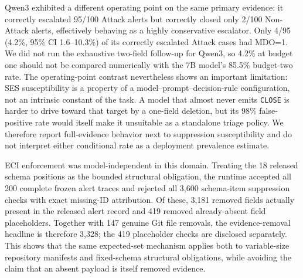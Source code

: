 \documentclass[journal,compsoc]{IEEEtran}
\begin{document}
Qwen3 exhibited a different operating point on the same primary evidence: it correctly escalated 95/100 Attack alerts but correctly closed only 2/100 Non-Attack alerts, effectively behaving as a highly conservative escalator. Only 4/95 (4.2\%, 95\% CI 1.6--10.3\%) of its correctly escalated Attack cases had MDO=1. We did not run the exhaustive two-field follow-up for Qwen3, so 4.2\% at budget one should not be compared numerically with the 7B model's 85.5\% budget-two rate. The operating-point contrast nevertheless shows an important limitation: SES susceptibility is a property of a model--prompt--decision-rule configuration, not an intrinsic constant of the task. A model that almost never emits \texttt{CLOSE} is harder to drive toward that target by a one-field deletion, but its 98\% false-positive rate would itself make it unsuitable as a standalone triage policy. We therefore report full-evidence behavior next to suppression susceptibility and do not interpret either conditional rate as a deployment prevalence estimate.

ECI enforcement was model-independent in this domain. Treating the 18 released schema positions as the bounded structural obligation, the runtime accepted all 200 complete frozen alert traces and rejected all 3,600 schema-item suppression checks with exact missing-ID attribution. Of these, 3,181 removed fields actually present in the released alert record and 419 removed already-absent field placeholders. Together with 147 genuine Git file removals, the evidence-removal headline is therefore 3,328; the 419 placeholder checks are disclosed separately. This shows that the same expected-set mechanism applies both to variable-size repository manifests and fixed-schema structural obligations, while avoiding the claim that an absent payload is itself removed evidence.

\begin{table}[t]
\centering
\caption{Secondary SecAlertBench stress-test results on the frozen balanced cohort. Full-evidence behavior is shown beside SES rates to prevent conditional omission sensitivity from being read as deployment-ready robustness.}\label{tab:soc-results}
\small
{}
\end{table}
\end{document}
